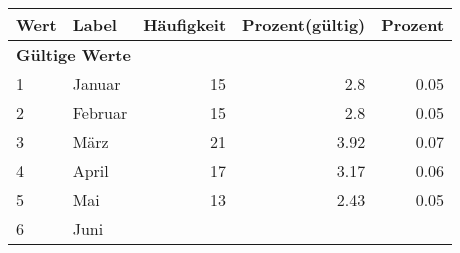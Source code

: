      \begin{longtable}{lXrrr}
     \toprule
     \textbf{Wert} & \textbf{Label} & \textbf{Häufigkeit} & \textbf{Prozent(gültig)} & \textbf{Prozent} \\
     \endhead
     \midrule
     \multicolumn{5}{l}{\textbf{Gültige Werte}}\\

     1 &
     \multicolumn{1}{X}{ Januar   } &


       \num{15} &
       \num[round-mode=places,round-precision=2]{2.8} &
         \num[round-mode=places,round-precision=2]{0.05} \\

     2 &
     \multicolumn{1}{X}{ Februar   } &


       \num{15} &
       \num[round-mode=places,round-precision=2]{2.8} &
         \num[round-mode=places,round-precision=2]{0.05} \\

     3 &
     \multicolumn{1}{X}{ März   } &


       \num{21} &
       \num[round-mode=places,round-precision=2]{3.92} &
         \num[round-mode=places,round-precision=2]{0.07} \\

     4 &
     \multicolumn{1}{X}{ April   } &


       \num{17} &
       \num[round-mode=places,round-precision=2]{3.17} &
         \num[round-mode=places,round-precision=2]{0.06} \\

     5 &
     \multicolumn{1}{X}{ Mai   } &


       \num{13} &
       \num[round-mode=places,round-precision=2]{2.43} &
         \num[round-mode=places,round-precision=2]{0.05} \\

     6 &
     \multicolumn{1}{X}{ Juni   } &



\end{longtable}
